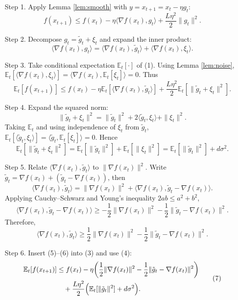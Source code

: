 \documentclass[11pt]{article}
\newcommand{\E}{\mathbb{E}}
\newcommand{\grad}{\nabla}
\begin{document}
\begin{enumerate}
\item[Step 1.] Apply Lemma \ref{lem:smooth} with $y=x_{t+1}=x_t-\eta g_t$:
\[
f(x_{t+1})\le f(x_t)-\eta\langle\grad f(x_t),g_t\rangle
     +\frac{L\eta^{2}}{2}\|g_t\|^{2}. \tag{1}
\]

\item[Step 2.] Decompose $g_t=\tilde g_t+\xi_t$ and expand the inner product:
\[
\langle\grad f(x_t),g_t\rangle
 =\langle\grad f(x_t),\tilde g_t\rangle
  +\langle\grad f(x_t),\xi_t\rangle. \tag{2}
\]

\item[Step 3.] Take conditional expectation $\E_t[\cdot]$ of (1). Using Lemma \ref{lem:noise},
$\E_t[\langle\grad f(x_t),\xi_t\rangle]=\langle\grad f(x_t),\E_t[\xi_t]\rangle=0$.
Thus
\[
\E_t[f(x_{t+1})]\le f(x_t)-\eta\E_t[\langle\grad f(x_t),\tilde g_t\rangle]
                +\frac{L\eta^{2}}{2}\E_t[\|\tilde g_t+\xi_t\|^{2}]. \tag{3}
\]

\item[Step 4.] Expand the squared norm:
\[
\|\tilde g_t+\xi_t\|^{2}
 =\|\tilde g_t\|^{2}+2\langle\tilde g_t,\xi_t\rangle+\|\xi_t\|^{2}.
\]
Taking $\E_t$ and using independence of $\xi_t$ from $\tilde g_t$,
$\E_t[\langle\tilde g_t,\xi_t\rangle]=\langle\tilde g_t,\E_t[\xi_t]\rangle=0$.
Hence
\[
\E_t[\|\tilde g_t+\xi_t\|^{2}]
 =\E_t[\|\tilde g_t\|^{2}]+\E_t[\|\xi_t\|^{2}]
 =\E_t[\|\tilde g_t\|^{2}]+d\sigma^{2}. \tag{4}
\]

\item[Step 5.] Relate $\langle\grad f(x_t),\tilde g_t\rangle$ to $\|\grad f(x_t)\|^{2}$.
Write $\tilde g_t = \grad f(x_t) + (\tilde g_t-\grad f(x_t))$,
then
\[
\langle\grad f(x_t),\tilde g_t\rangle
 =\|\grad f(x_t)\|^{2}
  +\langle\grad f(x_t),\tilde g_t-\grad f(x_t)\rangle.
\]
Applying Cauchy–Schwarz and Young’s inequality $2ab\le a^{2}+b^{2}$,
\[
\langle\grad f(x_t),\tilde g_t-\grad f(x_t)\rangle
 \ge -\frac{1}{2}\|\grad f(x_t)\|^{2}
      -\frac{1}{2}\|\tilde g_t-\grad f(x_t)\|^{2}. \tag{5}
\]
Therefore,
\[
\langle\grad f(x_t),\tilde g_t\rangle
 \ge \frac{1}{2}\|\grad f(x_t)\|^{2}
      -\frac{1}{2}\|\tilde g_t-\grad f(x_t)\|^{2}. \tag{6}
\]

\item[Step 6.] Insert (5)–(6) into (3) and use (4):
\[
\begin{aligned}
\E_t[f(x_{t+1})]
 &\le f(x_t)-\eta\!\left(\frac{1}{2}\|\grad f(x_t)\|^{2}
                     -\frac{1}{2}\|\tilde g_t-\grad f(x_t)\|^{2}\right) \\
 &\quad +\frac{L\eta^{2}}{2}\Bigl(\E_t[\|\tilde g_t\|^{2}]+d\sigma^{2}\Bigr).
\end{aligned} \tag{7}
\]


\end{enumerate}
\end{document}
